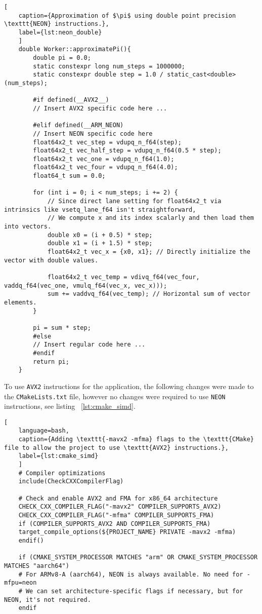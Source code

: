\begin{lstlisting}[
	caption={Approximation of $\pi$ using double point precision \texttt{NEON} instructions.},
	label={lst:neon_double}
	]
	double Worker::approximatePi(){
		double pi = 0.0;
		static constexpr long num_steps = 1000000;
		static constexpr double step = 1.0 / static_cast<double>(num_steps);
		
		#if defined(__AVX2__)
		// Insert AVX2 specific code here ...
		
		#elif defined(__ARM_NEON)
		// Insert NEON specific code here
		float64x2_t vec_step = vdupq_n_f64(step);
		float64x2_t vec_half_step = vdupq_n_f64(0.5 * step);
		float64x2_t vec_one = vdupq_n_f64(1.0);
		float64x2_t vec_four = vdupq_n_f64(4.0);
		float64_t sum = 0.0;
		
		for (int i = 0; i < num_steps; i += 2) {
			// Since direct lane setting for float64x2_t via intrinsics like vsetq_lane_f64 isn't straightforward,
			// We compute x and its index scalarly and then load them into vectors.
			double x0 = (i + 0.5) * step;
			double x1 = (i + 1.5) * step;
			float64x2_t vec_x = {x0, x1}; // Directly initialize the vector with double values.
			
			float64x2_t vec_temp = vdivq_f64(vec_four, vaddq_f64(vec_one, vmulq_f64(vec_x, vec_x)));
			sum += vaddvq_f64(vec_temp); // Horizontal sum of vector elements.
		}
		
		pi = sum * step;
		#else
		// Insert regular code here ...
		#endif
		return pi;
	}
\end{lstlisting}

To use \texttt{AVX2} instructions for the application, the following changes were made to the \texttt{CMakeLists.txt} file, however no changes were required to use \texttt{NEON} instructions, see listing ~\ref{lst:cmake_simd}.

\begin{lstlisting}[
	language=bash,
	caption={Adding \texttt{-mavx2 -mfma} flags to the \texttt{CMake} file to allow the project to use \texttt{AVX2} instructions.},
	label={lst:cmake_simd}
	]
	# Compiler optimizations
	include(CheckCXXCompilerFlag)
	
	# Check and enable AVX2 and FMA for x86_64 architecture
	CHECK_CXX_COMPILER_FLAG("-mavx2" COMPILER_SUPPORTS_AVX2)
	CHECK_CXX_COMPILER_FLAG("-mfma" COMPILER_SUPPORTS_FMA)
	if (COMPILER_SUPPORTS_AVX2 AND COMPILER_SUPPORTS_FMA)
	target_compile_options(${PROJECT_NAME} PRIVATE -mavx2 -mfma)
	endif()
	
	if (CMAKE_SYSTEM_PROCESSOR MATCHES "arm" OR CMAKE_SYSTEM_PROCESSOR MATCHES "aarch64")
	# For ARMv8-A (aarch64), NEON is always available. No need for -mfpu=neon
	# We can set architecture-specific flags if necessary, but for NEON, it's not required.
	endif
\end{lstlisting}

